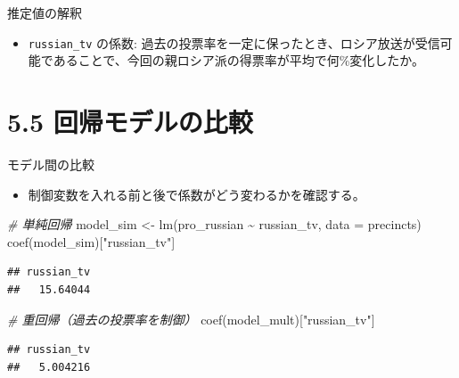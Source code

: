 \documentclass[
  ignorenonframetext,
]{beamer}
\newenvironment{Shaded}{\begin{snugshade}}{\end{snugshade}}
\newcommand{\AttributeTok}[1]{\textcolor[rgb]{0.77,0.63,0.00}{#1}}
\newcommand{\CommentTok}[1]{\textcolor[rgb]{0.56,0.35,0.01}{\textit{#1}}}
\newcommand{\FunctionTok}[1]{\textcolor[rgb]{0.00,0.00,0.00}{#1}}
\newcommand{\NormalTok}[1]{#1}
\newcommand{\OtherTok}[1]{\textcolor[rgb]{0.56,0.35,0.01}{#1}}
\newcommand{\SpecialCharTok}[1]{\textcolor[rgb]{0.00,0.00,0.00}{#1}}
\newcommand{\StringTok}[1]{\textcolor[rgb]{0.31,0.60,0.02}{#1}}
\providecommand{\tightlist}{%
  \setlength{\itemsep}{0pt}\setlength{\parskip}{0pt}}
\begin{document}
\begin{frame}[fragile]{推定値の解釈}
\protect\hypertarget{ux63a8ux5b9aux5024ux306eux89e3ux91c8}{}
\begin{itemize}
\tightlist
\item
  \texttt{russian\_tv} の係数:
  過去の投票率を一定に保ったとき、ロシア放送が受信可能であることで、今回の親ロシア派の得票率が平均で何\%変化したか。
\end{itemize}
\end{frame}

\hypertarget{ux56deux5e30ux30e2ux30c7ux30ebux306eux6bd4ux8f03}{%
\section{5.5
回帰モデルの比較}\label{ux56deux5e30ux30e2ux30c7ux30ebux306eux6bd4ux8f03}}

\begin{frame}[fragile]{モデル間の比較}
\protect\hypertarget{ux30e2ux30c7ux30ebux9593ux306eux6bd4ux8f03}{}
\begin{itemize}
\tightlist
\item
  制御変数を入れる前と後で係数がどう変わるかを確認する。
\end{itemize}

\footnotesize

\begin{Shaded}
\begin{Highlighting}[]
\CommentTok{\# 単純回帰}
\NormalTok{model\_sim }\OtherTok{\textless{}{-}} \FunctionTok{lm}\NormalTok{(pro\_russian }\SpecialCharTok{\textasciitilde{}}\NormalTok{ russian\_tv, }\AttributeTok{data =}\NormalTok{ precincts)}
\FunctionTok{coef}\NormalTok{(model\_sim)[}\StringTok{"russian\_tv"}\NormalTok{]}
\end{Highlighting}
\end{Shaded}

\begin{verbatim}
## russian_tv 
##   15.64044
\end{verbatim}

\begin{Shaded}
\begin{Highlighting}[]
\CommentTok{\# 重回帰（過去の投票率を制御）}
\FunctionTok{coef}\NormalTok{(model\_mult)[}\StringTok{"russian\_tv"}\NormalTok{]}
\end{Highlighting}
\end{Shaded}

\begin{verbatim}
## russian_tv 
##   5.004216
\end{verbatim}

\normalsize
\end{frame}
\end{document}
